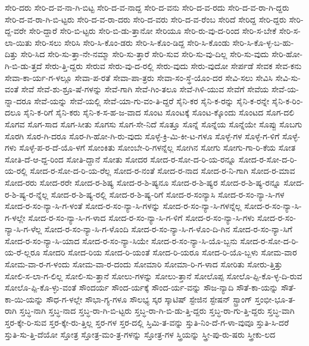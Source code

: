 {ಸೇರಿ-ದರು
ಸೇರಿ-ದ-ವ-ನಾ-ಗಿ-ಬಿಟ್ಟ
ಸೇರಿ-ದ-ವ-ನಾದ್ದ
ಸೇರಿ-ದ-ವನು
ಸೇರಿ-ದ-ವ-ರದು
ಸೇರಿ-ದ-ವ-ರಾ-ಗಿ-ದ್ದರು
ಸೇರಿ-ದ-ವ-ರಾ-ಗಿ-ಬಿ-ಟ್ಟರು
ಸೇರಿ-ದ-ವ-ರಾ-ದರು
ಸೇರಿ-ದ-ವರು
ಸೇರಿ-ದ-ವ-ರೆಂಬ
ಸೇರಿದೆ
ಸೇರಿದ್ದ
ಸೇರಿ-ದ್ದರು
ಸೇರಿ-ದ್ದ-ವರೇ
ಸೇರಿ-ದ್ದಾರೆ
ಸೇರಿ-ಬಿ-ಟ್ಟರು
ಸೇರಿ-ಬಿ-ಡು-ತ್ತಾನೋ
ಸೇರಿಯೂ
ಸೇರಿ-ರು-ವು-ದ-ರಿಂದ
ಸೇರಿ-ಸ-ಬೇಕೆ
ಸೇರಿ-ಸ-ಲಾ-ಯಿತು
ಸೇರಿ-ಸಲು
ಸೇರಿಸಿ
ಸೇರಿ-ಸಿ-ಕೊಂ-ಡರು
ಸೇರಿ-ಸಿ-ಕೊಂ-ಡಿದ್ದ
ಸೇರಿ-ಸಿ-ಕೊಂಡು
ಸೇರಿ-ಸಿ-ಕೊ-ಳ್ಳ-ಬ-ಹು-ದಿತ್ತು
ಸೇರಿ-ಸಿದ
ಸೇರಿ-ಸು-ತ್ತಾ-ನೇ-ನಮ್ಮಾ
ಸೇರಿ-ಸು-ತ್ತಾರೆ
ಸೇರಿ-ಸುವ
ಸೇರಿ-ಸು-ವು-ದಿಲ್ಲ
ಸೇರಿ-ಸು-ವುದು
ಸೇರಿ-ಹೋ-ಗಿ-ಬಿ-ಡು-ತ್ತದೆ
ಸೇರು-ತ್ತಿ-ದ್ದರು
ಸೇರುವ
ಸೇರು-ವು-ದ-ರಲ್ಲಿ
ಸೇರು-ವುದು
ಸೇರು-ವುದೋ
ಸೇರ್ಪಡೆ
ಸೇವಕ
ಸೇವ-ಕನು
ಸೇವಾ-ಕಾ-ರ್ಯ-ಗ-ಳಲ್ಲೂ
ಸೇವಾ-ಪ-ರತೆ
ಸೇವಾ-ಪಾ-ತ್ರರು
ಸೇವಾ-ಸಂ-ಸ್ಥೆ-ಯೊಂ-ದರ
ಸೇವಿ-ಸಲು
ಸೇವಿಸಿ
ಸೇವಿ-ಸು-ವಂತೆ
ಸೇವೆ
ಸೇವೆ-ಶು-ಶ್ರೂ-ಷೆ-ಗಳನ್ನು
ಸೇವೆ-ಗಾಗಿ
ಸೇವೆ-ಗಿಂ-ತಲೂ
ಸೇವೆ-ಗಿಳಿ-ಯುವ
ಸೇವೆಗೆ
ಸೇವೆಯ
ಸೇವೆ-ಯ-ನ್ನಾ-ದರೂ
ಸೇವೆ-ಯನ್ನು
ಸೇವೆ-ಯಲ್ಲಿ
ಸೇವೆ-ಯಾ-ಗು-ವಂ-ತಿ-ದ್ದರೆ
ಸೈನಿ-ಕರ
ಸೈನಿ-ಕ-ರನ್ನು
ಸೈನಿ-ಕ-ರನ್ನೇ
ಸೈನಿ-ಕ-ರಿಂ-ದಲೂ
ಸೈನಿ-ಕ-ರಿಗೆ
ಸೈನಿ-ಕರು
ಸೈನಿ-ಕ-ಸ-ಹ-ಜ-ವಾದ
ಸೊಂಟ
ಸೊಂಟಕ್ಕೆ
ಸೊಂಟ-ಕ್ಕೊಂದು
ಸೊಂಟದ
ಸೊಗ-ದಲಿ
ಸೊಗವ
ಸೊಗ-ಸಾದ
ಸೊಗ-ಸೀತು
ಸೊಗಸು
ಸೊಗ-ಸೇ-ನಿದೆ
ಸೊತ್ತೂ
ಸೊನ್ನೆ
ಸೊನ್ನೆಯ
ಸೊನ್ನೆಯೇ
ಸೊಪ್ಪು
ಸೊಬಗು
ಸೊರಗಿ
ಸೊರ-ಗಿ-ದರೂ
ಸೊರ-ಗಿ-ಹೋ-ಗಿ-ರು-ವುದು
ಸೊಳ್ಳೆ-ಕ್ರಿ-ಮಿ-ಕೀ-ಟ-ಗಳೂ
ಸೊಳ್ಳೆ-ಗಳ
ಸೊಳ್ಳೆ-ಗ-ಳಿಗೆ
ಸೊಳ್ಳೆ-ಗಳು
ಸೊಳ್ಳೆ-ಪ-ರ-ದೆ-ಯೊ-ಳಗೆ
ಸೋಂಕಿತು
ಸೋಂಬೇ-ರಿ-ಗಳನ್ನೆಲ್ಲ
ಸೋಗಿನ
ಸೋಗು
ಸೋಗು-ಗಾ-ರಿ-ಕೆಯ
ಸೋತ
ಸೋತಿ-ದೆ-ಆ-ದ್ದ-ರಿಂದ
ಸೋತಿ-ದ್ದಾನೆ
ಸೋತು
ಸೋದರ
ಸೋದ-ರ-ಸೋ-ದ-ರಿ-ಯ-ರನ್ನೂ
ಸೋದ-ರ-ಸೋ-ದ-ರಿ-ಯ-ರಲ್ಲಿ
ಸೋದ-ರ-ಸೋ-ದ-ರಿ-ಯ-ರೆಲ್ಲ
ಸೋದ-ರ-ನಂತೆ
ಸೋದ-ರ-ನಾದ
ಸೋದ-ರ-ನಿ-ಗಾಗಿ
ಸೋದ-ರ-ಮಾವ
ಸೋದ-ರರು
ಸೋದ-ರರೇ
ಸೋದ-ರ-ಶಿಷ್ಯ
ಸೋದ-ರ-ಶಿ-ಷ್ಯನೂ
ಸೋದ-ರ-ಶಿ-ಷ್ಯರ
ಸೋದ-ರ-ಶಿ-ಷ್ಯ-ರನ್ನೂ
ಸೋದ-ರ-ಶಿ-ಷ್ಯ-ರ-ನ್ನೆಲ್ಲ
ಸೋದ-ರ-ಶಿ-ಷ್ಯ-ರಲ್ಲಿ
ಸೋದ-ರ-ಶಿ-ಷ್ಯ-ರಿಗೆ
ಸೋದ-ರ-ಸಂನ್ಯಾಸಿ
ಸೋದ-ರ-ಸಂ-ನ್ಯಾ-ಸಿ-ಗಳ
ಸೋದ-ರ-ಸಂ-ನ್ಯಾ-ಸಿ-ಗ-ಳಂತೆ
ಸೋದ-ರ-ಸಂ-ನ್ಯಾ-ಸಿ-ಗಳನ್ನು
ಸೋದ-ರ-ಸಂ-ನ್ಯಾ-ಸಿ-ಗಳನ್ನೆಲ್ಲ
ಸೋದ-ರ-ಸಂ-ನ್ಯಾ-ಸಿ-ಗ-ಳಲ್ಲೇ
ಸೋದ-ರ-ಸಂ-ನ್ಯಾ-ಸಿ-ಗ-ಳಾದ
ಸೋದ-ರ-ಸಂ-ನ್ಯಾ-ಸಿ-ಗ-ಳಿಗೆ
ಸೋದ-ರ-ಸಂ-ನ್ಯಾ-ಸಿ-ಗಳು
ಸೋದ-ರ-ಸಂ-ನ್ಯಾ-ಸಿ-ಗ-ಳೆಲ್ಲ
ಸೋದ-ರ-ಸಂ-ನ್ಯಾ-ಸಿ-ಗ-ಳೊಂದಿ
ಸೋದ-ರ-ಸಂ-ನ್ಯಾ-ಸಿ-ಗ-ಳೊಂ-ದಿ-ಗಿನ
ಸೋದ-ರ-ಸಂ-ನ್ಯಾ-ಸಿಗೆ
ಸೋದ-ರ-ಸಂ-ನ್ಯಾ-ಸಿ-ಯಾದ
ಸೋದ-ರ-ಸಂ-ನ್ಯಾ-ಸಿಯೇ
ಸೋದ-ರ-ಸಂ-ನ್ಯಾ-ಸಿ-ಯೊ-ಬ್ಬನು
ಸೋದ-ರ-ಸೋ-ದ-ರಿ-ಯ-ರೆ-ಲ್ಲರೂ
ಸೋದರಿ
ಸೋದ-ರಿಯ
ಸೋದ-ರಿ-ಯಂತೆ
ಸೋದ-ರಿ-ಯರೂ
ಸೋದ-ರಿ-ಯೊ-ಬ್ಬಳು
ಸೋಮ-ವಾರ
ಸೋಮ-ವಾ-ರ-ಗ-ಳಂದು
ಸೋಮ-ವಾ-ರ-ದಂದು
ಸೋಮಾರಿ
ಸೋಮಾ-ರಿ-ಗ-ಳಾದ
ಸೋರಿತು
ಸೋರು-ತ್ತಿತ್ತು
ಸೋಲಿ-ಸ-ಲಾ-ಗ-ಲಿಲ್ಲ
ಸೋಲಿ-ಸು-ತ್ತಾನೆ
ಸೋಲು-ಗಳನ್ನು
ಸೋಲು-ತ್ತಾನೆ
ಸೋಲೊಪ್ಪ
ಸೋಲೊ-ಪ್ಪಿ-ಕೊ-ಳ್ಳ-ದಿ-ರುವ
ಸೋಲೊ-ಪ್ಪಿ-ಕೊ-ಳ್ಳು-ವಂತೆ
ಸೌಂದರ್ಯ
ಸೌಂದ-ರ್ಯಕ್ಕೆ
ಸೌಂದ-ರ್ಯ-ವನ್ನು
ಸೌಜ-ನ್ಯಾದಿ
ಸೌತೆ-ಕಾ-ಯನ್ನು
ಸೌತೆ-ಕಾ-ಯಿ-ಯನ್ನು
ಸೌಧ-ಗ-ಳಲ್ಲೇ
ಸೌಭಾ-ಗ್ಯ-ಗಳೂ
ಸೌಲಭ್ಯ
ಸ್ಕರ
ಸ್ಕಾಟಿಷ್
ಸ್ಟೇಜಿನ
ಸ್ಟೇಷನ್
ಸ್ಟ್ರಾಂಗ್
ಸ್ತಂಭೀ-ಭೂ-ತ-ರಾಗಿ
ಸ್ತಬ್ಧ-ನಾಗಿ
ಸ್ತಬ್ಧ-ನಾದ
ಸ್ತಬ್ಧ-ರಾ-ಗಿ-ಬಿ-ಟ್ಟರು
ಸ್ತಬ್ಧ-ರಾ-ಗಿ-ಬಿ-ಡು-ತ್ತಿ-ದ್ದರು
ಸ್ತಬ್ಧ-ರಾ-ಗು-ತ್ತಿ-ದ್ದರು
ಸ್ತಬ್ಧ-ವಾಗಿ
ಸ್ತರ-ಕ್ಕೇ-ರಿ-ಸುವ
ಸ್ತರ-ಕ್ಕೇ-ರು-ತ್ತಿಲ್ಲ
ಸ್ತರ-ಗಳ
ಸ್ತರ-ದಲ್ಲಿ
ಸ್ತಿಮಿ-ತ-ವನ್ನು
ಸ್ತುತಿ-ನಿಂ-ದೆ-ಗ-ಳಾ-ವುವೂ
ಸ್ತುತಿ-ಸಿ-ದರೆ
ಸ್ತುತಿ-ಸು-ತ್ತಿ-ದೆಯೋ
ಸ್ತೋತ್ರ
ಸ್ತೋತ್ರ-ಮಂ-ತ್ರ-ಗಳನ್ನು
ಸ್ತೋತ್ರ-ಗಳ
ಸ್ತ್ರಿಯನ್ನು
ಸ್ತ್ರೀ-ಪು-ರು-ಷರು
ಸ್ತ್ರೀಕು-ಲದ
}

